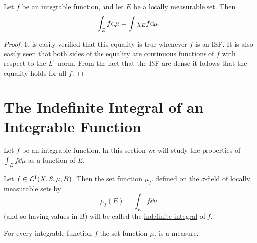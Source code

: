 \begin{proposition}
Let $f$ be an integrable function, and let $E$ be a locally measurable set. Then $$\int_Ef\dd\mu=\int\chi_{E}f\dd\mu.$$
\end{proposition}

\begin{proof}
It is easily verified that this equality is true whenever $f$ is an ISF. It is also easily seen that both sides of the equality are continuous functions of $f$ with respect to the $L^1$-norm. From the fact that the ISF are dense it follows that the equality holds for all $f$.
\end{proof}

\section{The Indefinite Integral of an Integrable Function}

Let $f$ be an integrable function. In this section we will study the properties of $\int_Ef\dd\mu$ as a function of $E$.

\begin{definition}
Let $f\in{\cal L}^1(X,S,\mu,B)$. Then the set function $\mu_f$, defined on the $\sigma$-field of locally measurable sets by $$\mu_f(E)=\int_Ef\dd\mu$$ (and so having values in B) will be called the \underline{indefinite integral} of $f$.
\end{definition}

\begin{theorem}
For every integrable function $f$ the set function $\mu_f$ is a measure.
\end{theorem}

